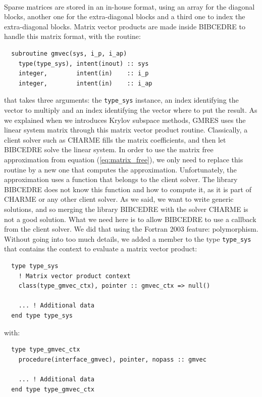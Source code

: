       \paragraph{}
      Sparse matrices are stored in an in-house format, using an array for the diagonal blocks, another one for the extra-diagonal blocks and a third one to index the extra-diagonal blocks.
      Matrix vector products are made inside BIBCEDRE to handle this matrix format, with the routine:
\begin{verbatim}
  subroutine gmvec(sys, i_p, i_ap)
    type(type_sys), intent(inout) :: sys
    integer,        intent(in)    :: i_p
    integer,        intent(in)    :: i_ap
\end{verbatim}
      that takes three arguments: the \texttt{type_sys} instance, an index identifying the vector to multiply and an index identifying the vector where to put the result.
      As we explained when we introduces Krylov subspace methods, GMRES uses the linear system matrix through this matrix vector product routine.
      Classically, a client solver such as CHARME fills the matrix coefficients, and then let BIBCEDRE solve the linear system.
      In order to use the matrix free approximation from equation (\ref{eq:matrix_free}), we only need to replace this routine by a new one that computes the approximation.
      Unfortunately, the approximation uses a function that belongs to the client solver.
      The library BIBCEDRE does not know this function and how to compute it, as it is part of CHARME or any other client solver.
      As we said, we want to write generic solutions, and so merging the library BIBCEDRE with the solver CHARME is not a good solution.
      What we need here is to allow BIBCEDRE to use a callback from the client solver.
      We did that using the Fortran 2003 feature: polymorphism.
      Without going into too much details, we added a member to the type \texttt{type_sys} that contains the context to evaluate a matrix vector product:
\begin{verbatim}
  type type_sys
    ! Matrix vector product context
    class(type_gmvec_ctx), pointer :: gmvec_ctx => null()

    ... ! Additional data
  end type type_sys
\end{verbatim}
      with:
\begin{verbatim}
  type type_gmvec_ctx
    procedure(interface_gmvec), pointer, nopass :: gmvec

    ... ! Additional data
  end type type_gmvec_ctx
\end{verbatim}
